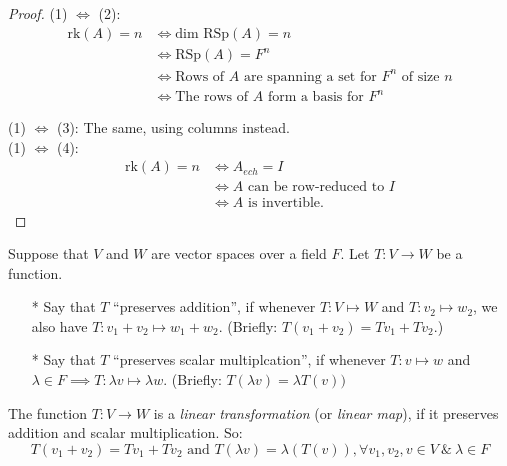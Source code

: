 \begin{proof}
(1) $\iff$ (2):\\
\[\begin{aligned}
\text{rk}(A) = n & \iff \text{dim RSp}(A) = n\\
&\iff \text{RSp}(A) = F^n\\
& \iff \text{Rows of } A \text{ are spanning a set for } F^n \text{ of size } n\\
& \iff \text{The rows of } A \text{ form a basis for }F^n
\end{aligned}
\]

(1) $\iff$ (3): The same, using columns instead.\\

(1) $\iff$ (4): 
\[
\begin{aligned}
\text{rk}(A) = n &\iff A_{ech} = I\\
&\iff A \text{ can be row-reduced to } I\\
&\iff A \text{ is invertible.}
\end{aligned}\]
\end{proof}

Suppose that $V$ and $W$ are vector spaces over a field $F$. Let $T: V \to W$ be a function.

\begin{itemize}
\item[*] Say that $T$ ``preserves addition'', if whenever $T: V \mapsto W$ and $T: v_2 \mapsto w_2$, we also have $T: v_1 + v_2 \mapsto w_1 + w_2$. (Briefly: $T(v_1 + v_2)=Tv_1 +Tv_2$.)
\item[*] Say that $T$ ``preserves scalar multiplcation'', if whenever $T: v \mapsto w$ and $\lambda \in F \implies T: \lambda v \mapsto \lambda w$. (Briefly: $T(\lambda v) = \lambda T(v))$
\end{itemize}

\begin{definition}The function $T: V \to W$ is a \emph{linear transformation} (or \emph{linear map}), if it preserves addition and scalar multiplication. So:
\[T(v_1 + v_2)=Tv_1 +Tv_2 \text{ and }T(\lambda v) = \lambda(T(v)), \forall v_1,v_2,v \in V ~\&~ \lambda \in F\]
\end{definition}\vspace*{10pt}


